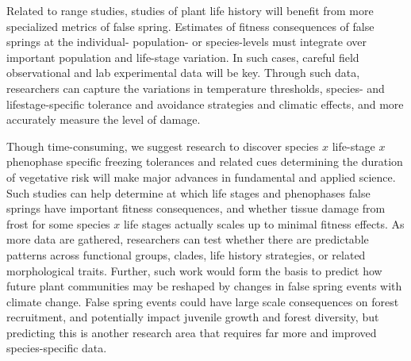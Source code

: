 \documentclass{article}\usepackage[]{graphicx}\usepackage[]{color}
\begin{document}
Related to range studies, studies of plant life history will benefit from more specialized metrics of false spring. Estimates of fitness consequences of false springs at the individual- population- or species-levels must integrate over important population and life-stage variation. In such cases, careful field observational and lab experimental data will be key. Through such data, researchers can capture the variations in temperature thresholds, species- and lifestage-specific tolerance and avoidance strategies and climatic effects, and more accurately measure the level of damage.  

Though time-consuming, we suggest research to discover species \(x\) life-stage \(x\) phenophase specific freezing tolerances and related cues determining the duration of vegetative risk %
will make major advances in fundamental and applied science. Such studies can help determine at which life stages and phenophases false springs have important fitness consequences, and whether tissue damage from frost for some species \(x\) life stages actually scales up to minimal fitness effects. As more data are gathered, researchers can test whether there are predictable patterns across functional groups, clades, life history strategies, or related morphological traits. Further, such work would form the basis to predict how future plant communities may be reshaped by changes in false spring events with climate change. False spring events could have large scale consequences on forest recruitment, and potentially impact juvenile growth and forest diversity, but predicting this is another research area that requires far more and improved species-specific data. 
\end{document}
